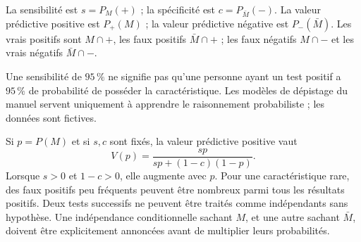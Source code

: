 La sensibilité est $s=P_M(+)$ ; la spécificité est $c=P_{\bar M}(-)$.
La valeur prédictive positive est $P_+(M)$ ; la valeur prédictive négative est $P_-(\bar M)$.
Les vrais positifs sont $M\cap+$, les faux positifs $\bar M\cap+$ ; les faux négatifs $M\cap-$ et les vrais négatifs $\bar M\cap-$.
\begin{attention}
Une sensibilité de $95\,\%$ ne signifie pas qu'une personne ayant un test positif a $95\,\%$ de probabilité de posséder la caractéristique.
Les modèles de dépistage du manuel servent uniquement à apprendre le raisonnement probabiliste ; les données sont fictives.
\end{attention}
Si $p=P(M)$ et si $s,c$ sont fixés, la valeur prédictive positive vaut
\[V(p)=\frac{sp}{sp+(1-c)(1-p)}.\]
Lorsque $s>0$ et $1-c>0$, elle augmente avec $p$. Pour une caractéristique rare, des faux positifs peu fréquents peuvent être nombreux parmi tous les résultats positifs.
Deux tests successifs ne peuvent être traités comme indépendants sans hypothèse. Une indépendance conditionnelle sachant $M$, et une autre sachant $\bar M$, doivent être explicitement annoncées avant de multiplier leurs probabilités.

